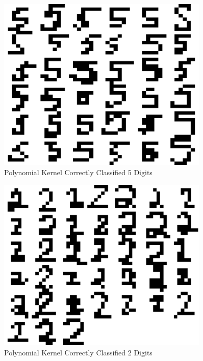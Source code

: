 \documentclass{article}
\begin{document}
\begin{figure}
\centering
\includegraphics[width=0.9\textwidth]{images/test2_5_correct5s_a0156.png}
\caption{Polynomial Kernel Correctly Classified 5 Digits}
\label{poly5correcttest}
\end{figure}

\begin{figure}
\centering
\includegraphics[width=0.9\textwidth]{images/test2_5_correct2s_a0156.png}
\caption{Polynomial Kernel Correctly Classified 2 Digits}
\label{poly2correcttest}
\end{figure}
\end{document}
